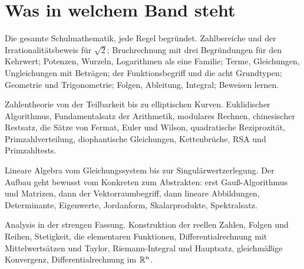\section{Was in welchem Band steht}

\begin{merksatz}
Die gesamte Schulmathematik, jede Regel begründet. Zahlbereiche und der Irrationalitätsbeweis für $\sqrt2$; Bruchrechnung mit drei Begründungen für den Kehrwert; Potenzen, Wurzeln, Logarithmen als eine Familie; Terme, Gleichungen, Ungleichungen mit Beträgen; der Funktionsbegriff und die acht Grundtypen; Geometrie und Trigonometrie; Folgen, Ableitung, Integral; Beweisen lernen.

\end{merksatz}

\begin{merksatz}
Zahlentheorie von der Teilbarkeit bis zu elliptischen Kurven. Euklidischer Algorithmus, Fundamentalsatz der Arithmetik, modulares Rechnen, chinesischer Restsatz, die Sätze von Fermat, Euler und Wilson, quadratische Reziprozität, Primzahlverteilung, diophantische Gleichungen, Kettenbrüche, RSA und Primzahltests.

\end{merksatz}

\begin{merksatz}
Lineare Algebra vom Gleichungssystem bis zur Singulärwertzerlegung. Der Aufbau geht bewusst vom Konkreten zum Abstrakten: erst Gauß-Algorithmus und Matrizen, dann der Vektorraumbegriff, dann lineare Abbildungen, Determinante, Eigenwerte, Jordanform, Skalarprodukte, Spektralsatz.

\end{merksatz}

\begin{merksatz}
Analysis in der strengen Fassung. Konstruktion der reellen Zahlen, Folgen und Reihen, Stetigkeit, die elementaren Funktionen, Differentialrechnung mit Mittelwertsätzen und Taylor, Riemann-Integral und Hauptsatz, gleichmäßige Konvergenz, Differentialrechnung im $\mathbb{R}^{n}$.

\end{merksatz}

